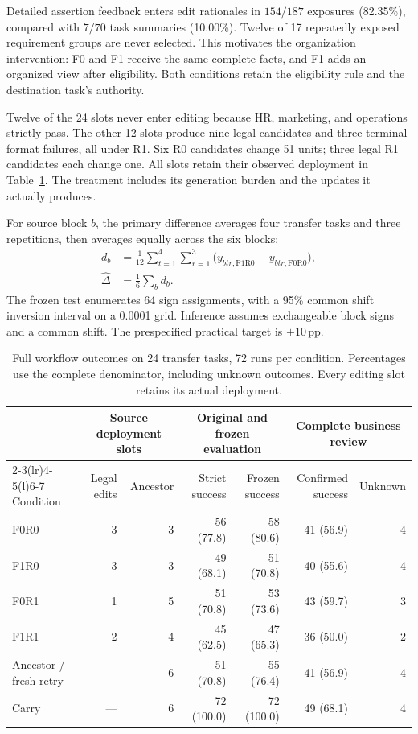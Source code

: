\documentclass{ecai}
\newcommand{\pp}{\,\mathrm{pp}}
\begin{document}
Detailed assertion feedback enters edit rationales in $154/187$ exposures (82.35\%), compared with $7/70$ task summaries (10.00\%). Twelve of 17 repeatedly exposed requirement groups are never selected. This motivates the organization intervention: F0 and F1 receive the same complete facts, and F1 adds an organized view after eligibility. Both conditions retain the eligibility rule and the destination task's authority.

Twelve of the 24 slots never enter editing because HR, marketing, and operations strictly pass. The other 12 slots produce nine legal candidates and three terminal format failures, all under R1. Six R0 candidates change 51 units; three legal R1 candidates each change one. All slots retain their observed deployment in Table~\ref{tab:transfer}. The treatment includes its generation burden and the updates it actually produces.

For source block $b$, the primary difference averages four transfer tasks and three repetitions, then averages equally across the six blocks:
\begin{equation}
\begin{aligned}
d_b&=\frac{1}{12}\sum_{t=1}^4\sum_{r=1}^3
\bigl(y_{btr,\mathrm{F1R0}}-y_{btr,\mathrm{F0R0}}\bigr),\\
\widehat\Delta&=\frac{1}{6}\sum_b d_b.
\end{aligned}
\label{eq:effect}
\end{equation}
The frozen test enumerates 64 sign assignments, with a 95\% common shift inversion interval on a 0.0001 grid. Inference assumes exchangeable block signs and a common shift. The prespecified practical target is $+10\pp$.

\begin{table}[t]
\centering
\caption{Full workflow outcomes on 24 transfer tasks, 72 runs per condition. Percentages use the complete denominator, including unknown outcomes. Every editing slot retains its actual deployment.}
\label{tab:transfer}
\footnotesize
\renewcommand{\arraystretch}{1.14}
\begin{tabular*}{\textwidth}{@{\extracolsep{\fill}}lrrrrrr@{}}
\toprule
& \multicolumn{2}{c}{Source deployment slots} & \multicolumn{2}{c}{Original and frozen evaluation} & \multicolumn{2}{c}{Complete business review}\\
\cmidrule(lr){2-3}\cmidrule(lr){4-5}\cmidrule(l){6-7}
Condition & Legal edits & Ancestor & Strict success & Frozen success & Confirmed success & Unknown\\
\midrule
F0R0 & 3 & 3 & 56 (77.8) & 58 (80.6) & 41 (56.9) & 4\\
F1R0 & 3 & 3 & 49 (68.1) & 51 (70.8) & 40 (55.6) & 4\\
F0R1 & 1 & 5 & 51 (70.8) & 53 (73.6) & 43 (59.7) & 3\\
F1R1 & 2 & 4 & 45 (62.5) & 47 (65.3) & 36 (50.0) & 2\\
\addlinespace
Ancestor / fresh retry & --- & 6 & 51 (70.8) & 55 (76.4) & 41 (56.9) & 4\\
Carry & --- & 6 & 72 (100.0) & 72 (100.0) & 49 (68.1) & 4\\
\bottomrule
\end{tabular*}
\end{table}
\end{document}
